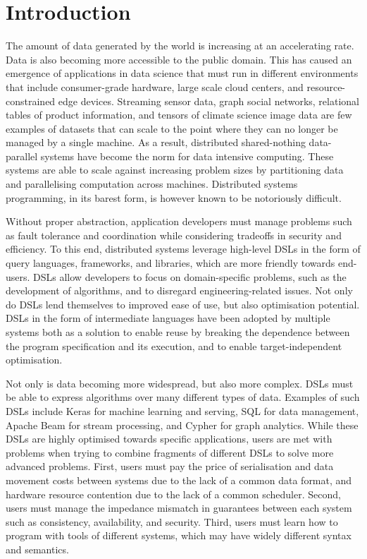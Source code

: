 \section{Introduction}


The amount of data generated by the world is increasing at an accelerating rate. Data is also becoming more accessible to the public domain. This has caused an emergence of applications in data science that must run in different environments that include consumer-grade hardware, large scale cloud centers, and resource-constrained edge devices. Streaming sensor data, graph social networks, relational tables of product information, and tensors of climate science image data are few examples of datasets that can scale to the point where they can no longer be managed by a single machine. As a result, distributed shared-nothing data-parallel systems have become the norm for data intensive computing. These systems are able to scale against increasing problem sizes by partitioning data and parallelising computation across machines. Distributed systems programming, in its barest form, is however known to be notoriously difficult.

Without proper abstraction, application developers must manage problems such as fault tolerance and coordination while considering tradeoffs in security and efficiency. To this end, distributed systems leverage high-level DSLs in the form of query languages, frameworks, and libraries, which are more friendly towards end-users. DSLs allow developers to focus on domain-specific problems, such as the development of algorithms, and to disregard engineering-related issues. Not only do DSLs lend themselves to improved ease of use, but also optimisation potential. DSLs in the form of intermediate languages have been adopted by multiple systems both as a solution to enable reuse by breaking the dependence between the program specification and its execution, and to enable target-independent optimisation.

% 
Not only is data becoming more widespread, but also more complex. DSLs must be able to express algorithms over many different types of data. Examples of such DSLs include Keras\cite{Keras} for machine learning and serving, SQL\cite{SQL} for data management, Apache Beam\cite{Beam} for stream processing, and Cypher\cite{Cypher} for graph analytics. While these DSLs are highly optimised towards specific applications, users are met with problems when trying to combine fragments of different DSLs to solve more advanced problems. First, users must pay the price of serialisation and data movement costs between systems due to the lack of a common data format, and hardware resource contention due to the lack of a common scheduler. Second, users must manage the impedance mismatch in guarantees between each system such as consistency, availability, and security. Third, users must learn how to program with tools of different systems, which may have widely different syntax and semantics.

